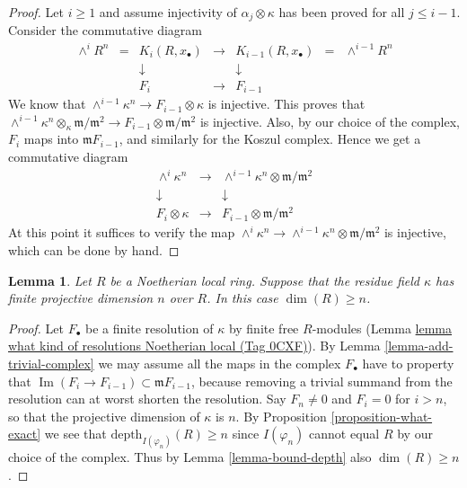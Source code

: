 \documentclass{amsart}
\theoremstyle{plain}
\newtheorem{lemma}[subsection]{Lemma}
\theoremstyle{definition}
\theoremstyle{remark}
\numberwithin{equation}{subsection}
\def\Im{\mathop{\mathrm{Im}}}
\begin{document}
\begin{proof}
\medskip\noindent
Let $i \geq 1$ and assume injectivity of $\alpha_j \otimes \kappa$ has been
proved for all $j \leq i - 1$. Consider the commutative diagram
$$
\begin{matrix}
\wedge^i R^n & = & K_i(R, x_{\bullet}) & \to & K_{i-1}(R, x_{\bullet})
& = & \wedge^{i-1} R^n \\
& & \downarrow & & \downarrow & & \\
& & F_i & \to & F_{i-1} & &
\end{matrix}
$$
We know that $\wedge^{i-1} \kappa^n \to F_{i-1} \otimes \kappa$
is injective. This proves that
$\wedge^{i-1} \kappa^n \otimes_{\kappa} \mathfrak m/\mathfrak m^2
\to F_{i-1} \otimes \mathfrak m/\mathfrak m^2$ is injective.
Also, by our choice of the complex, $F_i$ maps into
$\mathfrak mF_{i-1}$, and similarly for the Koszul complex.
Hence we get a commutative diagram
$$
\begin{matrix}
\wedge^i \kappa^n & \to &
\wedge^{i-1} \kappa^n \otimes \mathfrak m/\mathfrak m^2 \\
\downarrow & & \downarrow \\
F_i \otimes \kappa & \to & F_{i-1} \otimes \mathfrak m/\mathfrak m^2
\end{matrix}
$$
At this point it suffices to verify the map
$\wedge^i \kappa^n \to
\wedge^{i-1} \kappa^n \otimes \mathfrak m/\mathfrak m^2$
is injective, which can be done by hand.
\end{proof}


\begin{lemma}
\label{lemma-dim-gl-dim}
Let $R$ be a Noetherian local ring.
Suppose that the residue field $\kappa$ has finite
projective dimension $n$ over $R$.
In this case $\dim(R) \geq n$.
\end{lemma}

\begin{proof}
Let $F_{\bullet}$ be a finite resolution of $\kappa$ by finite free
$R$-modules (Lemma \href{https://stacks.math.columbia.edu/tag/0CXF}{lemma what kind of resolutions Noetherian local (Tag 0CXF)}).
By Lemma \ref{lemma-add-trivial-complex}
we may assume all the maps in the complex $F_{\bullet}$
have to property that $\Im(F_i \to F_{i-1})
\subset \mathfrak m F_{i-1}$, because removing a trivial
summand from the resolution can at worst shorten the resolution.
Say $F_n \not = 0$ and $F_i = 0$ for $i > n$, so that
the projective dimension of $\kappa$ is $n$.
By Proposition \ref{proposition-what-exact} we see that
$\text{depth}_{I(\varphi_n)}(R) \geq n$ since $I(\varphi_n)$
cannot equal $R$ by our choice of the complex.
Thus by Lemma \ref{lemma-bound-depth} also $\dim(R) \geq n$.
\end{proof}
\end{document}
